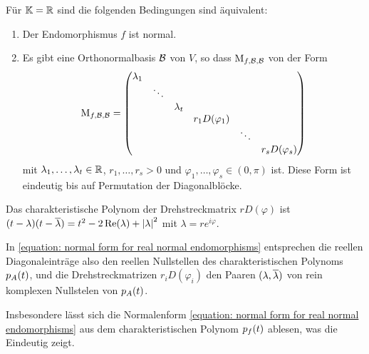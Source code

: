 \begin{theorem}
  \label{theorem: normal form for real normal endomorphisms}
  Für $\mathbb{K} = \mathbb{R}$ sind die folgenden Bedingungen sind äquivalent:
  \begin{enumerate}
    \item
      Der Endomorphismus $f$ ist normal.
    \item
      Es gibt eine Orthonormalbasis $\mathcal{B}$ von $V$, so dass $\operatorname{M}_{f, \mathcal{B}, \mathcal{B}}$ von der Form
      \begin{equation}
      \label{equation: normal form for real normal endomorphisms}
          \operatorname{M}_{f, \mathcal{B}, \mathcal{B}}
        = \begin{pmatrix}
            \lambda_1 &         &           &                   &         &                   \\
                      & \ddots  &           &                   &         &                   \\
                      &         & \lambda_t &                   &         &                   \\
                      &         &           & r_1 D(\varphi_1)  &         &                   \\
                      &         &           &                   & \ddots  &                   \\
                      &         &           &                   &         & r_s D(\varphi_s)
          \end{pmatrix}
      \end{equation}
      mit $\lambda_1, \dotsc, \lambda_t \in \mathbb{R}$, $r_1, \dotsc, r_s > 0$ und $\varphi_1, \dotsc, \varphi_s \in (0, \pi)$ ist.
      Diese Form ist eindeutig bis auf Permutation der Diagonalblöcke.
  \end{enumerate}
\end{theorem}

\begin{remark}
  Das charakteristische Polynom der Drehstreckmatrix $r D(\varphi)$ ist $(t - \lambda)(t - \overline{\lambda}) = t^2 - 2\operatorname{Re}(\lambda) + \left| \lambda \right|^2$ mit $\lambda = r e^{i \varphi}$.
  
  In \eqref{equation: normal form for real normal endomorphisms} entsprechen die reellen Diagonaleinträge also den reellen Nullstellen des charakteristischen Polynoms $p_{A}(t)$, und die Drehstreckmatrizen $r_i D(\varphi_i)$ den Paaren $(\lambda, \overline{\lambda})$ von rein komplexen Nullstelen von $p_{A}(t)$.
  
  Insbesondere lässt sich die Normalenform \eqref{equation: normal form for real normal endomorphisms} aus dem charakteristischen Polynom $p_{f}(t)$ ablesen, was die Eindeutig zeigt.
\end{remark}

